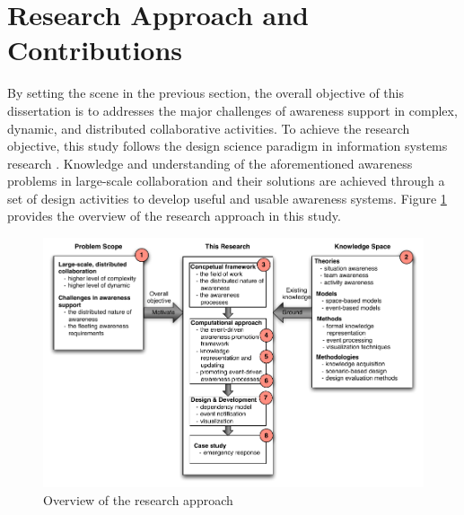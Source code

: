 \section{Research Approach and Contributions} %
\label{sec:research_approach_and_contributions}
By setting the scene in the previous section, the overall objective of this dissertation is to addresses the major challenges of awareness support in complex, dynamic, and distributed collaborative activities. To achieve the research objective, this study follows the design science paradigm in information systems research \cite{Hevner2004}. Knowledge and understanding of the aforementioned awareness problems in large-scale collaboration and their solutions are achieved through a set of design activities to develop useful and usable awareness systems. Figure \ref{fig:research_overview} provides the overview of the research approach in this study.

\begin{figure}[htbp] %
   \centering
   \includegraphics[width=5.8in]{research_overview.pdf} 
   \caption{Overview of the research approach}
   \label{fig:research_overview}
\end{figure}

